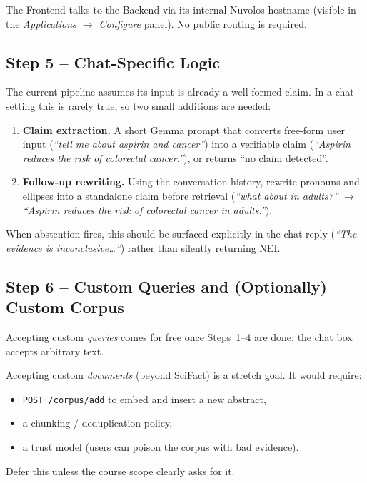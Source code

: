 \documentclass[11pt,a4paper]{article}
\begin{document}
The Frontend talks to the Backend via its internal Nuvolos hostname
(visible in the \textit{Applications $\to$ Configure} panel). No public
routing is required.

\subsection{Step 5 -- Chat-Specific Logic}

The current pipeline assumes its input is already a well-formed claim.
In a chat setting this is rarely true, so two small additions are
needed:

\begin{enumerate}
  \item \textbf{Claim extraction.} A short Gemma prompt that converts
        free-form user input (\textit{``tell me about aspirin and
        cancer''}) into a verifiable claim
        (\textit{``Aspirin reduces the risk of colorectal cancer.''}),
        or returns ``no claim detected''.
  \item \textbf{Follow-up rewriting.} Using the conversation history,
        rewrite pronouns and ellipses into a standalone claim before
        retrieval (\textit{``what about in adults?''} $\to$
        \textit{``Aspirin reduces the risk of colorectal cancer in
        adults.''}).
\end{enumerate}

When abstention fires, this should be surfaced explicitly in the chat
reply (\textit{``The evidence is inconclusive\ldots''}) rather than
silently returning NEI.

\subsection{Step 6 -- Custom Queries and (Optionally) Custom Corpus}

Accepting custom \emph{queries} comes for free once Steps~1--4 are done:
the chat box accepts arbitrary text.

Accepting custom \emph{documents} (beyond SciFact) is a stretch goal.
It would require:
\begin{itemize}
  \item \texttt{POST /corpus/add} to embed and insert a new abstract,
  \item a chunking / deduplication policy,
  \item a trust model (users can poison the corpus with bad evidence).
\end{itemize}
Defer this unless the course scope clearly asks for it.
\end{document}

